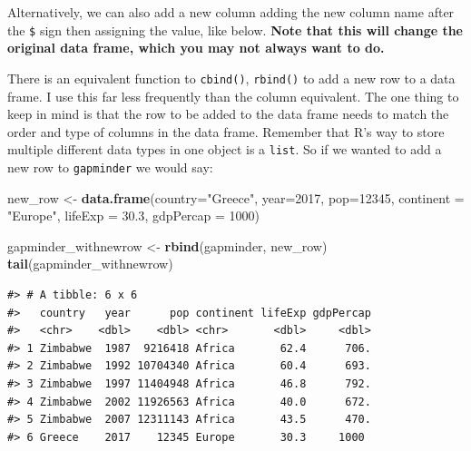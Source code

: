 \documentclass[
]{book}
\newenvironment{Shaded}{\begin{snugshade}}{\end{snugshade}}
\newcommand{\AttributeTok}[1]{\textcolor[rgb]{0.13,0.29,0.53}{#1}}
\newcommand{\CommentTok}[1]{\textcolor[rgb]{0.56,0.35,0.01}{\textit{#1}}}
\newcommand{\ConstantTok}[1]{\textcolor[rgb]{0.56,0.35,0.01}{#1}}
\newcommand{\DecValTok}[1]{\textcolor[rgb]{0.00,0.00,0.81}{#1}}
\newcommand{\FloatTok}[1]{\textcolor[rgb]{0.00,0.00,0.81}{#1}}
\newcommand{\FunctionTok}[1]{\textcolor[rgb]{0.13,0.29,0.53}{\textbf{#1}}}
\newcommand{\NormalTok}[1]{#1}
\newcommand{\OtherTok}[1]{\textcolor[rgb]{0.56,0.35,0.01}{#1}}
\newcommand{\SpecialCharTok}[1]{\textcolor[rgb]{0.81,0.36,0.00}{\textbf{#1}}}
\newcommand{\StringTok}[1]{\textcolor[rgb]{0.31,0.60,0.02}{#1}}
\begin{document}
Alternatively, we can also add a new column adding the new column name after the \texttt{\$} sign then assigning the value, like below. \textbf{Note that this will change the original data frame, which you may not always want to do.}

\begin{Shaded}
\end{Shaded}

There is an equivalent function to \texttt{cbind()}, \texttt{rbind()} to add a new row to a data frame. I use this far less frequently than the column equivalent. The one thing to keep in mind is that the row to be added to the data frame needs to match the order and type of columns in the data frame. Remember that R's way to store multiple different data types in one object is a \texttt{list}. So if we wanted to add a new row to \texttt{gapminder} we would say:

\begin{Shaded}
\begin{Highlighting}[]
\NormalTok{new\_row }\OtherTok{\textless{}{-}} \FunctionTok{data.frame}\NormalTok{(}\AttributeTok{country=}\StringTok{"Greece"}\NormalTok{, }\AttributeTok{year=}\DecValTok{2017}\NormalTok{,}
                \AttributeTok{pop=}\DecValTok{12345}\NormalTok{, }\AttributeTok{continent =} \StringTok{"Europe"}\NormalTok{, }\AttributeTok{lifeExp =} \FloatTok{30.3}\NormalTok{,}
                \AttributeTok{gdpPercap =} \DecValTok{1000}\NormalTok{)}

\NormalTok{gapminder\_withnewrow }\OtherTok{\textless{}{-}} \FunctionTok{rbind}\NormalTok{(gapminder, new\_row)}
\FunctionTok{tail}\NormalTok{(gapminder\_withnewrow)}
\end{Highlighting}
\end{Shaded}

\begin{verbatim}
#> # A tibble: 6 x 6
#>   country   year      pop continent lifeExp gdpPercap
#>   <chr>    <dbl>    <dbl> <chr>       <dbl>     <dbl>
#> 1 Zimbabwe  1987  9216418 Africa       62.4      706.
#> 2 Zimbabwe  1992 10704340 Africa       60.4      693.
#> 3 Zimbabwe  1997 11404948 Africa       46.8      792.
#> 4 Zimbabwe  2002 11926563 Africa       40.0      672.
#> 5 Zimbabwe  2007 12311143 Africa       43.5      470.
#> 6 Greece    2017    12345 Europe       30.3     1000
\end{verbatim}
\end{document}
